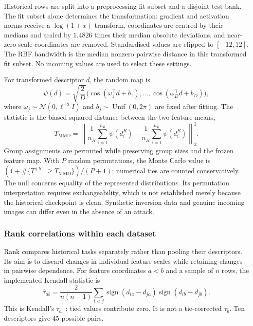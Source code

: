 Historical rows are split into a preprocessing-fit subset and a disjoint
test bank. The fit subset alone determines the transformation: gradient and
activation norms receive a $\log(1+x)$ transform, coordinates are centred
by their medians and scaled by $1.4826$ times their median absolute
deviations, and near-zero-scale coordinates are removed. Standardised
values are clipped to $[-12,12]$. The RBF bandwidth is the median nonzero
pairwise distance in this transformed fit subset. No incoming values are
used to select these settings.

For transformed descriptor $d$, the random map is
\begin{equation}
    \psi(d)=\sqrt{\frac{2}{D}}
       \bigl(\cos(\omega_1^\top d+b_1),\ldots,
             \cos(\omega_D^\top d+b_D)\bigr),
    \label{eq:methods-rff}
\end{equation}
where $\omega_j\sim\mathcal{N}(0,\ell^{-2}I)$ and
$b_j\sim\operatorname{Unif}(0,2\pi)$ are fixed after fitting. The statistic
is the biased squared distance between the two feature means,
\begin{equation}
    T_{\mathrm{MMD}}=
    \left\|\frac{1}{n_R}\sum_{i=1}^{n_R}\psi(d_i^R)
          -\frac{1}{n_B}\sum_{i=1}^{n_B}\psi(d_i^B)\right\|_2^2.
    \label{eq:methods-mmd}
\end{equation}
Group assignments are permuted while preserving group sizes and the frozen
feature map. With $P$ random permutations, the Monte Carlo value is
$(1+\#\{T^{(b)}\geq T_{\mathrm{MMD}}\})/(P+1)$; numerical ties are
counted conservatively. The null concerns equality of the represented
distributions. Its permutation interpretation requires exchangeability,
which is not established merely because the historical checkpoint is
clean. Synthetic inversion data and genuine incoming images can differ
even in the absence of an attack.

\subsubsection{Rank correlations within each dataset}
\label{subsubsec:methods-rank}

Rank compares historical tasks separately rather than pooling their
descriptors. Its aim is to discard changes in individual feature scales
while retaining changes in pairwise dependence. For feature coordinates
$a<b$ and a sample of $n$ rows, the implemented Kendall statistic is
\begin{equation}
    \widehat{\tau}_{ab}
    =\frac{2}{n(n-1)}\sum_{i<j}
       \operatorname{sign}(d_{ia}-d_{ja})
       \operatorname{sign}(d_{ib}-d_{jb}).
    \label{eq:methods-kendall}
\end{equation}
This is Kendall's $\tau_a$~\cite{kendall1938rank}; tied values contribute
zero. It is not a tie-corrected $\tau_b$. Ten descriptors give 45 possible
pairs.

